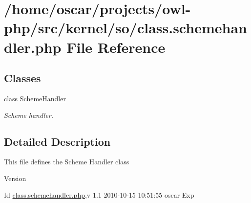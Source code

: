 \section{/home/oscar/projects/owl-\/php/src/kernel/so/class.schemehandler.php File Reference}
\label{class_8schemehandler_8php}
\subsection*{Classes}
\begin{DoxyCompactItemize}
\item 
class \hyperlink{classSchemeHandler}{SchemeHandler}
\begin{DoxyCompactList}\small\item\em Scheme handler. \item\end{DoxyCompactList}\end{DoxyCompactItemize}


\subsection{Detailed Description}
This file defines the Scheme Handler class \begin{DoxyVersion}{Version}

\end{DoxyVersion}
\begin{DoxyParagraph}{Id}
\hyperlink{class_8schemehandler_8php}{class.schemehandler.php},v 1.1 2010-\/10-\/15 10:51:55 oscar Exp 
\end{DoxyParagraph}
